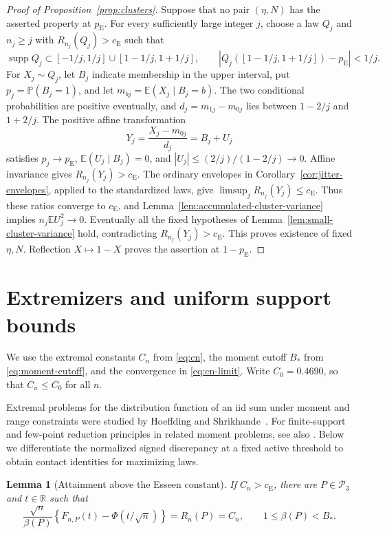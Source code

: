 \documentclass[aop]{imsart}
\theoremstyle{plain}
\newtheorem{lemma}[theorem]{Lemma}
\theoremstyle{definition}
\theoremstyle{definition}
\newcommand{\PP}{\mathbb P}
\newcommand{\EE}{\mathbb E}
\newcommand{\R}{\mathbb R}
\newcommand{\Pthree}{\mathcal P_3}
\newcommand{\ce}{c_{\mathrm E}}
\newcommand{\pe}{p_{\mathrm E}}
\DeclareMathOperator{\supp}{supp}
\begin{document}
\begin{proof}[Proof of Proposition~\ref{prop:clusters}]
Suppose that no pair $(\eta,N)$ has the asserted property at $\pe$.
For every sufficiently large integer $j$, choose a law $Q_j$ and
$n_j\ge j$ with $R_{n_j}(Q_j)>\ce$ such that
\[
 \supp Q_j\subset[-1/j,1/j]\cup[1-1/j,1+1/j],\qquad
 |Q_j([1-1/j,1+1/j])-\pe|<1/j.
\]
For $X_j\sim Q_j$, let $B_j$ indicate membership in the upper interval,
put $p_j=\PP(B_j=1)$, and let $m_{bj}=\EE(X_j\mid B_j=b)$.
The two conditional probabilities are positive eventually, and
$d_j=m_{1j}-m_{0j}$ lies between $1-2/j$ and $1+2/j$.
The positive affine transformation
\[
 Y_j=\frac{X_j-m_{0j}}{d_j}=B_j+U_j
\]
satisfies $p_j\to\pe$, $\EE(U_j\mid B_j)=0$, and
$|U_j|\le(2/j)/(1-2/j)\to0$. Affine invariance gives
$R_{n_j}(Y_j)>\ce$.
The ordinary envelopes in Corollary~\ref{cor:jitter-envelopes}, applied
to the standardized laws, give $\limsup_jR_{n_j}(Y_j)\le\ce$.
Thus these ratios converge to $\ce$, and
Lemma~\ref{lem:accumulated-cluster-variance} implies
$n_j\EE U_j^2\to0$. Eventually all the fixed hypotheses of
Lemma~\ref{lem:small-cluster-variance} hold, contradicting
$R_{n_j}(Y_j)>\ce$. This proves existence of fixed $\eta,N$.
Reflection $X\mapsto1-X$ proves the assertion at $1-\pe$.
\end{proof}

\section{Extremizers and uniform support bounds}
\label{sec:extremizers}

We use the extremal constants \(C_n\) from \eqref{eq:cn}, the moment
cutoff \(B_*\) from \eqref{eq:moment-cutoff}, and the convergence in
\eqref{eq:cn-limit}. Write \(C_0=0.4690\), so that \(C_n\le C_0\) for
all \(n\).

Extremal problems for the distribution function of an iid sum under
moment and range constraints were studied by Hoeffding and
Shrikhande~\cite{HoeffdingShrikhande1955}.
For finite-support and few-point reduction principles in related
moment problems, see also \cite[Section~3]{MattnerShevtsova2019}.
Below we differentiate the normalized signed discrepancy at a fixed
active threshold to obtain contact identities for maximizing laws.

\begin{lemma}[Attainment above the Esseen constant]
\label{lem:attainment}
If \(C_n>\ce\), there are \(P\in\Pthree\) and \(t\in\R\) such that
\begin{equation}
\label{eq:active-branch}
\frac{\sqrt n}{\beta(P)}
\left\{F_{n,P}(t)-\Phi(t/\sqrt n)\right\}
=R_n(P)=C_n,
\qquad
1\le\beta(P)<B_*.
\end{equation}
\end{lemma}
\end{document}
